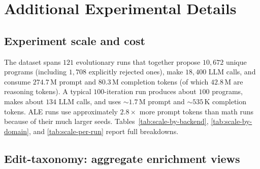 \section{Additional Experimental Details}
\label{appendix:experimental-details}

\subsection{Experiment scale and cost}
\label{appendix:experiment-scale}

The dataset spans $121$ evolutionary runs that together propose $10{,}672$ unique programs (including $1{,}708$ explicitly rejected ones), make $18{,}400$ LLM calls, and consume $274.7$\,M prompt and $80.3$\,M completion tokens (of which $42.8$\,M are reasoning tokens). A typical $100$-iteration run produces about $100$ programs, makes about $134$ LLM calls, and uses $\sim 1.7$\,M prompt and $\sim 535$\,K completion tokens. ALE runs use approximately $2.8\times$ more prompt tokens than math runs because of their much larger seeds. Tables~\ref{tab:scale-by-backend}, \ref{tab:scale-by-domain}, and \ref{tab:scale-per-run} report full breakdowns.

\begin{table}[h]
\centering
\caption{Experiment scale by backend. ``Edits'' counts programs with a non-null parent; LLM calls and tokens are aggregated from each run's call log.}
\label{tab:scale-by-backend}
\small
\setlength{\tabcolsep}{6pt}
\renewcommand{\arraystretch}{1.15}

\end{table}

\begin{table}[h]
\centering
\caption{Experiment scale by domain (ALE vs.\ math).}
\label{tab:scale-by-domain}
\small
\setlength{\tabcolsep}{6pt}
\renewcommand{\arraystretch}{1.15}

\end{table}

\begin{table}[h]
\centering
\caption{Per-run cost (medians and right tails) over the $121$ runs.}
\label{tab:scale-per-run}
\small
\setlength{\tabcolsep}{8pt}
\renewcommand{\arraystretch}{1.15}

\end{table}

\subsection{Edit-taxonomy: aggregate enrichment views}
\label{appendix:edit-taxonomy-aggregate}

